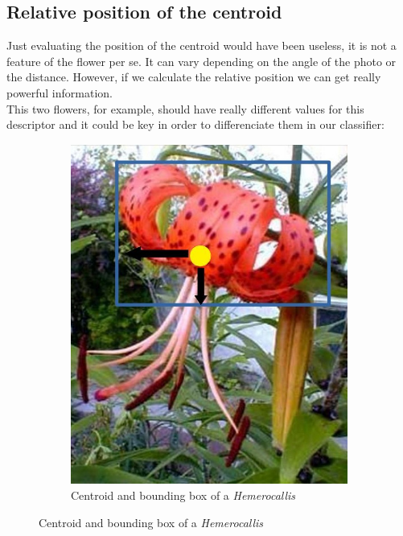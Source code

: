 \documentclass[11]{article}
\begin{document}
\subsection{Relative position of the centroid}

Just evaluating the position of the centroid would have been useless, it is not a feature of the flower per se. It can vary depending on the angle of the photo or the distance. However, if we calculate the relative position we can get really powerful information. 
\\

This two flowers, for example, should have really different values for this descriptor and it could be key in order to differenciate them in our classifier:
\begin{figure}[H]
    \begin{subfigure}[t]{0.45\textwidth}
    \centering
  \includegraphics[scale=0.2]{images/hemerocallisCentroid.jpg}
    \caption{Centroid and bounding box of a \textit{Hemerocallis}}
    \label{centroidHemerocallis}
    \end{subfigure}

\end{figure}
\end{document}
